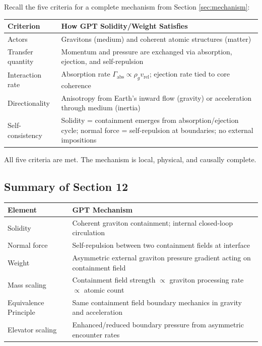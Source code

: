 \documentclass[12pt, a4paper]{article}
\begin{document}
Recall the five criteria for a complete mechanism from Section \ref{sec:mechanism}:

\begin{center}
\begin{tabular}{|p{3.5cm}|p{10cm}|}
\hline
\textbf{Criterion} & \textbf{How GPT Solidity/Weight Satisfies} \\
\hline
Actors & Gravitons (medium) and coherent atomic structures (matter) \\
\hline
Transfer quantity & Momentum and pressure are exchanged via absorption, ejection, and self-repulsion \\
\hline
Interaction rate & Absorption rate \( \Gamma_{\text{abs}} \propto \rho_g v_{\text{rel}} \); ejection rate tied to core coherence \\
\hline
Directionality & Anisotropy from Earth's inward flow (gravity) or acceleration through medium (inertia) \\
\hline
Self-consistency & Solidity = containment emerges from absorption/ejection cycle; normal force = self-repulsion at boundaries; no external impositions \\
\hline
\end{tabular}
\end{center}

All five criteria are met. The mechanism is local, physical, and causally complete.

\subsection{Summary of Section 12}
\label{subsec:summary_12}

\begin{center}
\begin{tabular}{|p{3.5cm}|p{10cm}|}
\hline
\textbf{Element} & \textbf{GPT Mechanism} \\
\hline
Solidity & Coherent graviton containment; internal closed-loop circulation \\
\hline
Normal force & Self-repulsion between two containment fields at interface \\
\hline
Weight & Asymmetric external graviton pressure gradient acting on containment field \\
\hline
Mass scaling & Containment field strength \( \propto \) graviton processing rate \( \propto \) atomic count \\
\hline
Equivalence Principle & Same containment field boundary mechanics in gravity and acceleration \\
\hline
Elevator scaling & Enhanced/reduced boundary pressure from asymmetric encounter rates \\
\hline
\end{tabular}
\end{center}
\end{document}

